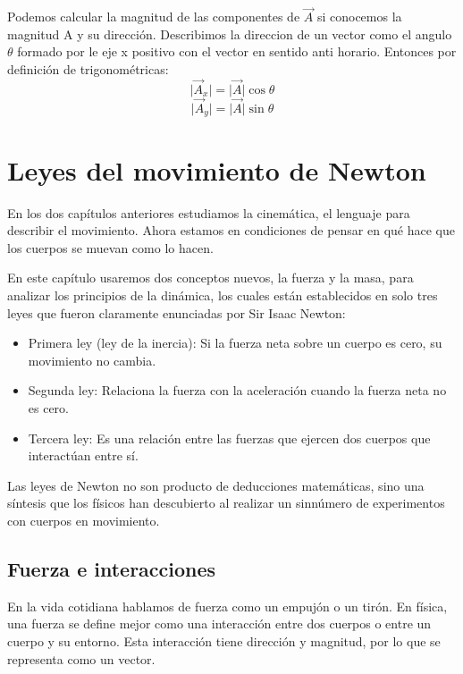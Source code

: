 \documentclass{article}
\newcommand{\newsection}[1]{
    \section{\centering \color{sectionColor} \bl{#1}}
}
\newcommand{\newsubsection}[1]{
    \subsection{\color{sectionColor} #1}
}
\newcommand{\bl}[1]{\textbf{#1}}
\begin{document}
    \par Podemos calcular la magnitud de las componentes de $\vec{A}$ si conocemos la magnitud A y su dirección. Describimos la direccion de un vector como el angulo $\theta$ formado por le eje x positivo con el vector en sentido anti horario. Entonces por definición de trigonométricas:
    \[ \lvert \vec{A}_x \rvert = \lvert \vec{A} \rvert \cos \theta \]
    \[ \lvert \vec{A}_y \rvert = \lvert \vec{A} \rvert \sin \theta \]


\newsection{Leyes del movimiento de Newton}

\par En los dos capítulos anteriores estudiamos la cinemática, el lenguaje para describir el movimiento. Ahora estamos en condiciones de pensar en qué hace que los cuerpos se muevan como lo hacen.

\par En este capítulo usaremos dos conceptos nuevos, la fuerza y la masa, para analizar los principios de la dinámica, los cuales están establecidos en solo tres leyes que fueron claramente enunciadas por Sir Isaac Newton:

\begin{itemize}
    \item Primera ley (ley de la inercia): Si la fuerza neta sobre un cuerpo es cero, su movimiento no cambia.
    \item Segunda ley: Relaciona la fuerza con la aceleración cuando la fuerza neta no es cero.
    \item Tercera ley: Es una relación entre las fuerzas que ejercen dos cuerpos que interactúan entre sí.
\end{itemize}

\par Las leyes de Newton no son producto de deducciones matemáticas, sino una síntesis que los físicos han descubierto al realizar un sinnúmero de experimentos con cuerpos en movimiento.


    \newsubsection{Fuerza e interacciones}

        \par En la vida cotidiana hablamos de fuerza como un empujón o un tirón. En física, una fuerza se define mejor como una interacción entre dos cuerpos o entre un cuerpo y su entorno. Esta interacción tiene dirección y magnitud, por lo que se representa como un vector.
\end{document}
